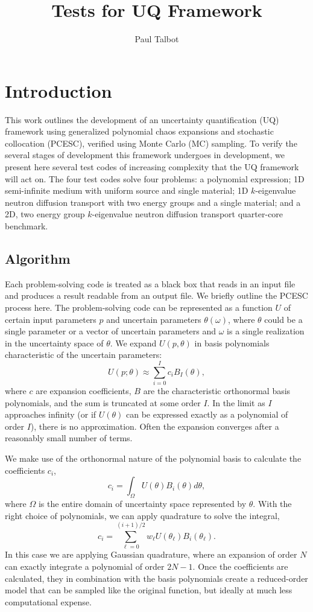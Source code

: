 \documentclass[11pt]{article} %
\title{Tests for UQ Framework}
\author{Paul Talbot}
\begin{document}
\maketitle
\section{Introduction}
This work outlines the development of an uncertainty quantification (UQ) framework using generalized polynomial chaos expansions and stochastic collocation (PCESC), verified using Monte Carlo (MC) sampling.  To verify the several stages of development this framework undergoes in development, we present here several test codes of increasing complexity that the UQ framework will act on.  The four test codes solve four problems: a polynomial expression; 1D semi-infinite medium with uniform source and single material; 1D $k$-eigenvalue neutron diffusion transport with two energy groups and a single material; and a 2D, two energy group $k$-eigenvalue neutron diffusion transport quarter-core benchmark.

\subsection{Algorithm}
Each problem-solving code is treated as a black box that reads in an input file and produces a result readable from an output file.  We briefly outline the PCESC process here.  The problem-solving code can be represented as a function $U$ of certain input parameters $p$ and uncertain parameters $\theta(\omega)$, where $\theta$ could be a single parameter or a vector of uncertain parameters and $\omega$ is a single realization in the uncertainty space of $\theta$.  We expand $U(p,\theta)$ in basis polynomials characteristic of the uncertain parameters:
\begin{equation}
U(p;\theta) \approx \sum_{i=0}^I c_i B_I(\theta),
\end{equation}
where $c$ are expansion coefficients, $B$ are the characteristic orthonormal basis polynomials, and the sum is truncated at some order $I$.  In the limit as $I$ approaches infinity (or if $U(\theta)$ can be expressed exactly as a polynomial of order $I$), there is no approximation.  Often the expansion converges after a reasonably small number of terms.

We make use of the orthonormal nature of the polynomial basis to calculate the coefficients $c_i$,
\begin{equation}
c_i = \int_\Omega U(\theta)B_i(\theta)d\theta,
\end{equation}
where $\Omega$ is the entire domain of uncertainty space represented by $\theta$.  With the right choice of polynomials, we can apply quadrature to solve the integral,
\begin{equation}
c_i = \sum_{\ell=0}^{(i+1)/2} w_\ell U(\theta_\ell) B_i(\theta_\ell).
\end{equation}
In this case we are applying Gaussian quadrature, where an expansion of order $N$ can exactly integrate a polynomial of order $2N-1$.  Once the coefficients are calculated, they in combination with the basis polynomials create a reduced-order model that can be sampled like the original function, but ideally at much less computational expense.
\end{document}
